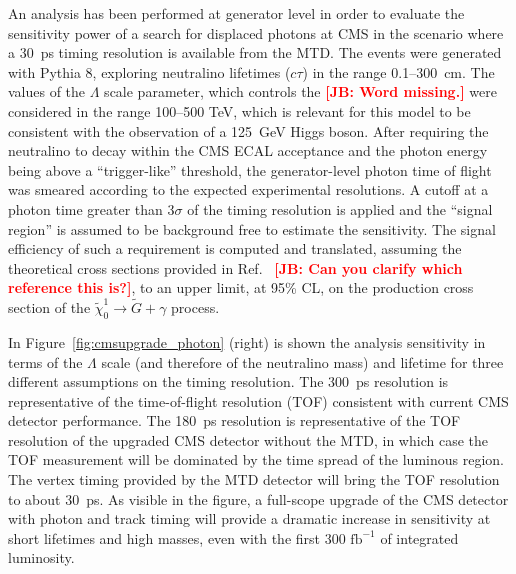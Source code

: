 An analysis has been performed at generator level in order to evaluate the sensitivity power of a search for displaced photons at CMS in the scenario where a 30~ps timing resolution is available from the MTD. The events were generated with Pythia 8, exploring neutralino lifetimes ($c\tau$) in the range 0.1--300~cm. The values of the $\Lambda$ scale parameter, which controls the {\bf \textcolor{red}{[JB: Word missing.]}} were considered in the range 100--500 TeV, which is relevant for this model to be consistent with the observation of a 125~GeV Higgs boson. After requiring the neutralino to decay within the CMS ECAL acceptance and the photon energy being above a ``trigger-like'' threshold, the generator-level photon time of flight was smeared according to the expected experimental resolutions. A cutoff at a photon time greater than 3$\sigma$ of the timing resolution is applied and the ``signal region'' is assumed to be background free to estimate the sensitivity. The signal efficiency of such a requirement is computed and translated, assuming the theoretical cross sections provided in Ref.~\cite{ref:GMSB} {\bf \textcolor{red}{[JB: Can you clarify which reference this is?]}}, to an upper limit, at 95\% CL, on the production cross section of the $\tilde{\chi}_0^1 \to \tilde{G} + \gamma$ process.

In Figure~\ref{fig:cmsupgrade_photon} (right) is shown the analysis sensitivity in terms of the $\Lambda$ scale (and therefore of the neutralino mass) and lifetime for three different assumptions on the timing resolution. The 300~ps resolution is representative of the time-of-flight resolution (TOF) consistent with current CMS detector performance. The 180~ps resolution is representative of the TOF resolution of the upgraded CMS detector without the MTD, in which case the TOF measurement will be dominated by the time spread of the luminous region. The vertex timing provided by the MTD detector will bring the TOF resolution to about 30~ps. As visible in the figure, a full-scope upgrade of the CMS detector with photon and track timing will provide a dramatic increase in sensitivity at short lifetimes and high masses, even with the first $300\,\,\mathrm{fb}^{-1}$ of integrated luminosity.

